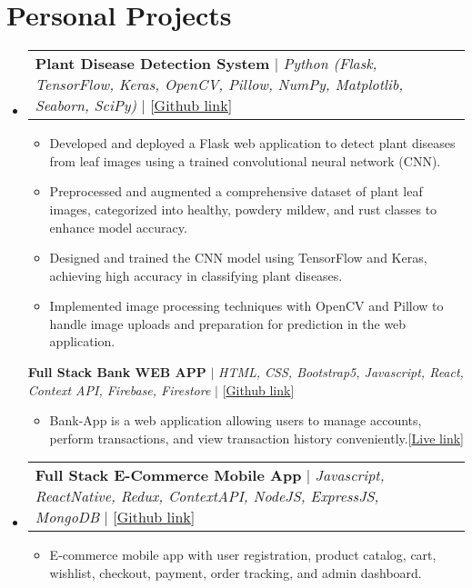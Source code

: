 \documentclass[letterpaper,11pt]{article}
\makeatletter
\newcommand{\resumeItem}[1]{
  \item\small{
    {#1 \vspace{-2pt}}
  }
}
\newcommand{\resumeProjectHeading}[2]{
    \item
    \begin{tabular*}{0.97\textwidth}{l@{\extracolsep{\fill}}r}
      \small#1 & #2 \\
    \end{tabular*}\vspace{-7pt}
}
\newcommand{\resumeSubHeadingListStart}{\begin{itemize}[leftmargin=0.15in, label={}]}
\newcommand{\resumeSubHeadingListEnd}{\end{itemize}}
\newcommand{\resumeItemListStart}{\begin{itemize}}
\newcommand{\resumeItemListEnd}{\end{itemize}\vspace{-5pt}}
\makeatother
\begin{document}
\section{\textbf{Personal Projects}}
\resumeSubHeadingListStart
\resumeProjectHeading
{\textbf{{Plant Disease Detection System}} $|$ \emph{Python (Flask, TensorFlow, Keras, OpenCV, Pillow, NumPy, Matplotlib, Seaborn, SciPy)} $|$ [{\href{https://github.com/Ahmadjajja/E_Commerce_Mobile_App_Frontend}{\underline{Github link}}}]}{}
\resumeItemListStart
\resumeItem{Developed and deployed a Flask web application to detect plant diseases from leaf images using a trained convolutional neural network (CNN).}
\resumeItem{Preprocessed and augmented a comprehensive dataset of plant leaf images, categorized into healthy, powdery mildew, and rust classes to enhance model accuracy.}
\resumeItem{Designed and trained the CNN model using TensorFlow and Keras, achieving high accuracy in classifying plant diseases.}
\resumeItem{Implemented image processing techniques with OpenCV and Pillow to handle image uploads and preparation for prediction in the web application.}
\resumeItemListEnd
{\textbf{{Full Stack Bank WEB APP}} $|$ \emph{HTML, CSS, Bootstrap5, Javascript, React, Context API, Firebase, Firestore} $|$ [{\href{https://github.com/Ahmadjajja/React_Bank}{\underline{Github link}}}]}{}
\resumeItemListStart
\resumeItem{Bank-App is a web application allowing users to manage accounts, perform
  transactions, and view transaction history conveniently.[{\href{https://jajja-bank-app.web.app/}{\underline{Live link}}}]}
\resumeItemListEnd
\resumeProjectHeading
{\textbf{{Full Stack E-Commerce Mobile App}} $|$ \emph{Javascript, ReactNative, Redux, ContextAPI, NodeJS,
    ExpressJS, MongoDB} $|$ [{\href{https://github.com/Ahmadjajja/E_Commerce_Mobile_App_Frontend}{\underline{Github link}}}]}{}
\resumeItemListStart
\resumeItem{E-commerce mobile app with user registration, product catalog, cart, wishlist,
  checkout, payment, order tracking, and admin dashboard.}
\resumeItemListEnd
\resumeSubHeadingListEnd


\end{document}
